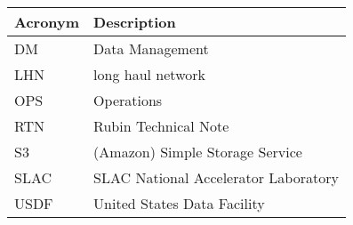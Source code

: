\addtocounter{table}{-1}
\begin{longtable}{p{}p{}}\hline
\textbf{Acronym} & \textbf{Description}  \\\hline

DM & Data Management \\\hline
LHN & long haul network \\\hline
OPS & Operations \\\hline
RTN & Rubin Technical Note \\\hline
S3 & (Amazon) Simple Storage Service \\\hline
SLAC & SLAC National Accelerator Laboratory \\\hline
USDF & United States Data Facility \\\hline
\end{longtable}

